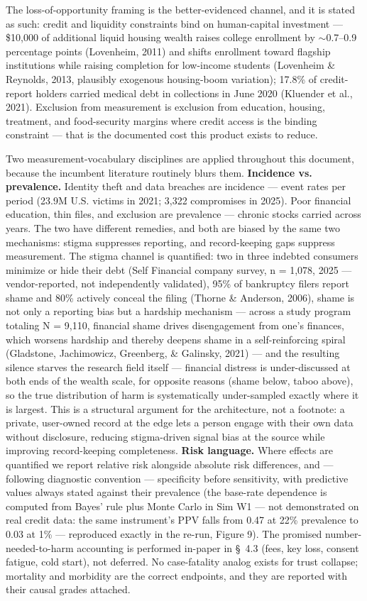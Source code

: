 \documentclass[11pt,twocolumn]{article}
\begin{document}
The loss-of-opportunity framing is the better-evidenced channel, and it is stated as such: credit and liquidity constraints bind on human-capital investment --- \$10,000 of additional liquid housing wealth raises college enrollment by $\sim$0.7--0.9 percentage points (Lovenheim, 2011) and shifts enrollment toward flagship institutions while raising completion for low-income students (Lovenheim \& Reynolds, 2013, plausibly exogenous housing-boom variation); 17.8\% of credit-report holders carried medical debt in collections in June 2020 (Kluender et al., 2021). Exclusion from measurement is exclusion from education, housing, treatment, and food-security margins where credit access is the binding constraint --- that is the documented cost this product exists to reduce.

Two measurement-vocabulary disciplines are applied throughout this document, because the incumbent literature routinely blurs them. \textbf{Incidence vs. prevalence.} Identity theft and data breaches are incidence --- event rates per period (23.9M U.S. victims in 2021; 3,322 compromises in 2025). Poor financial education, thin files, and exclusion are prevalence --- chronic stocks carried across years. The two have different remedies, and both are biased by the same two mechanisms: stigma suppresses reporting, and record-keeping gaps suppress measurement. The stigma channel is quantified: two in three indebted consumers minimize or hide their debt (Self Financial company survey, n = 1,078, 2025 --- vendor-reported, not independently validated), 95\% of bankruptcy filers report shame and 80\% actively conceal the filing (Thorne \& Anderson, 2006), shame is not only a reporting bias but a hardship mechanism --- across a study program totaling N = 9,110, financial shame drives disengagement from one's finances, which worsens hardship and thereby deepens shame in a self-reinforcing spiral (Gladstone, Jachimowicz, Greenberg, \& Galinsky, 2021) --- and the resulting silence starves the research field itself --- financial distress is under-discussed at both ends of the wealth scale, for opposite reasons (shame below, taboo above), so the true distribution of harm is systematically under-sampled exactly where it is largest. This is a structural argument for the architecture, not a footnote: a private, user-owned record at the edge lets a person engage with their own data without disclosure, reducing stigma-driven signal bias at the source while improving record-keeping completeness. \textbf{Risk language.} Where effects are quantified we report relative risk alongside absolute risk differences, and --- following diagnostic convention --- specificity before sensitivity, with predictive values always stated against their prevalence (the base-rate dependence is computed from Bayes' rule plus Monte Carlo in Sim W1 --- not demonstrated on real credit data: the same instrument's PPV falls from 0.47 at 22\% prevalence to 0.03 at 1\% --- reproduced exactly in the re-run, Figure 9). The promised number-needed-to-harm accounting is performed in-paper in \S~4.3 (fees, key loss, consent fatigue, cold start), not deferred. No case-fatality analog exists for trust collapse; mortality and morbidity are the correct endpoints, and they are reported with their causal grades attached.
\end{document}
